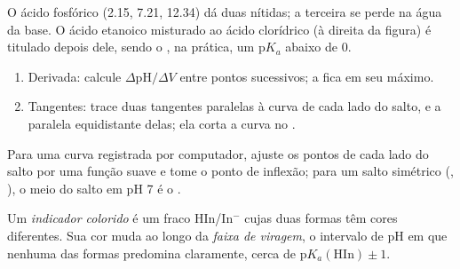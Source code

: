 O ácido fosfórico (2.15, 7.21, 12.34) dá duas  nítidas; a
terceira se perde na água da base. O ácido etanoico misturado ao ácido
clorídrico (à direita da figura) é titulado depois dele, sendo o , na prática, um $\mathrm{p}K_a$ abaixo de 0.

\begin{method}\label{met:b1:titration-methods:derivative}
\begin{enumerate}
  \item Derivada: calcule $\Delta\mathrm{pH}/\Delta V$ entre pontos
        sucessivos; a  fica em seu máximo.
  \item Tangentes: trace duas tangentes paralelas à curva de cada lado do
        salto, e a paralela equidistante delas; ela corta a curva no .
\end{enumerate}
\end{method}

\begin{method}\label{met:b1:titration-methods:tangents}
Para uma curva registrada por computador, ajuste os pontos de cada lado
do salto por uma função suave e tome o ponto de inflexão; para um salto
simétrico (, ), o meio do salto em pH 7 é o .
\end{method}

\begin{definition}\label{def:b1:titration-methods:indicator}
Um \emph{indicador colorido} é um  fraco
HIn/In$^-$ cujas duas formas têm cores diferentes. Sua cor muda ao longo
da \emph{faixa de viragem}, o intervalo de pH em que
nenhuma das formas predomina claramente, cerca de
$\mathrm{p}K_{a}(\mathrm{HIn}) \pm 1$.
\end{definition}

